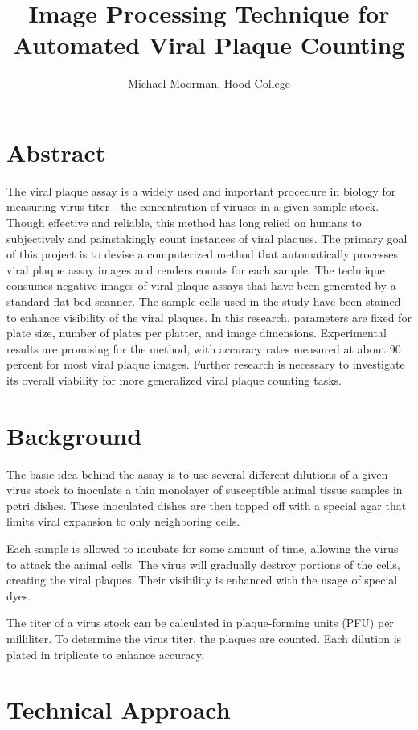 \documentclass[12pt,final,onecolumn]{IEEEtran}
\begin{document}
\title{Image Processing Technique for Automated Viral Plaque Counting}
\author{Michael Moorman, Hood College}
\maketitle
\section{Abstract}
The viral plaque assay is a widely used and important procedure in biology 
for measuring virus titer - the concentration of viruses in a given sample stock. 
Though effective and reliable, this method has long relied on humans to subjectively and painstakingly count instances of viral plaques. The primary goal of this project is to devise a computerized method that automatically processes viral plaque assay images and renders counts for each sample. The technique consumes negative images of viral plaque assays that have been generated by a standard flat bed scanner. The sample cells used in the study have been stained to enhance visibility of the viral plaques. In this research, parameters are fixed for plate size, number of plates per platter, and image dimensions. Experimental results are promising for the method, with accuracy rates measured at about 90 percent for
most viral plaque images. Further research is necessary to investigate its overall viability for more generalized viral plaque counting tasks.

\section{Background}
The basic idea behind the assay is to use several different dilutions of a given virus
stock to inoculate a thin monolayer of susceptible animal tissue samples in petri dishes. These inoculated dishes are then topped off with a special agar that limits viral expansion
to only neighboring cells. 

Each sample is allowed to incubate for some amount of time, allowing the virus to attack the animal cells. The virus will gradually destroy portions of the cells, creating the viral plaques. Their visibility is enhanced with the usage of special dyes. 

The titer of a virus stock can be calculated in plaque-forming units (PFU) per milliliter. To determine the virus titer, the plaques are counted. Each dilution is plated in triplicate to enhance accuracy.

\section{Technical Approach}
\end{document}
